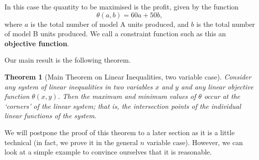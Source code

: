 \documentclass[a4paper,leqno]{article}
\numberwithin{equation}{section}
\newtheorem{thm}[equation]{Theorem}
\theoremstyle{definition}
\theoremstyle{remark}
\newcommand{\df}[1]{\textbf{#1}}
\begin{document}
In this case the quantity to be maximised is the profit, given by the function
\begin{equation}
  \theta(a,b) = 60a + 50b,
\end{equation}
where $ a $ is the total number of model A units produced, and $ b $ is the total number of model B units produced. We call a constraint function
such as this an \df{objective function}.

Our main result is the following theorem.
\begin{thm}[Main Theorem on Linear Inequalities, two variable case]
  Consider any system of linear inequalities in two variables $ x $ and $ y $ and any linear objective function $ \theta(x,y) $. Then the maximum
  and minimum values of $ \theta $ occur at the `corners' of the linear system; that is, the intersection points of the individual linear functions
  of the system.
\end{thm}
We will postpone the proof of this theorem to a later section as it is a little technical (in fact, we prove it in the general $ n $ variable case).
However, we can look at a simple example to convince ourselves that it is reasonable.
\end{document}
